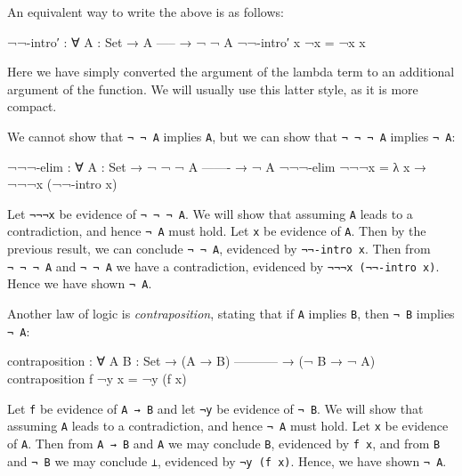 An equivalent way to write the above is as follows:

\begin{fence}
\begin{code}
¬¬-intro′ : ∀ {A : Set}
  → A
    -----
  → ¬ ¬ A
¬¬-intro′ x ¬x = ¬x x
\end{code}
\end{fence}

Here we have simply converted the argument of the lambda term to an
additional argument of the function. We will usually use this latter
style, as it is more compact.

We cannot show that \texttt{¬\ ¬\ A} implies \texttt{A}, but we can show
that \texttt{¬\ ¬\ ¬\ A} implies \texttt{¬\ A}:

\begin{fence}
\begin{code}
¬¬¬-elim : ∀ {A : Set}
  → ¬ ¬ ¬ A
    -------
  → ¬ A
¬¬¬-elim ¬¬¬x  =  λ x → ¬¬¬x (¬¬-intro x)
\end{code}
\end{fence}

Let \texttt{¬¬¬x} be evidence of \texttt{¬\ ¬\ ¬\ A}. We will show that
assuming \texttt{A} leads to a contradiction, and hence \texttt{¬\ A}
must hold. Let \texttt{x} be evidence of \texttt{A}. Then by the
previous result, we can conclude \texttt{¬\ ¬\ A}, evidenced by
\texttt{¬¬-intro\ x}. Then from \texttt{¬\ ¬\ ¬\ A} and \texttt{¬\ ¬\ A}
we have a contradiction, evidenced by \texttt{¬¬¬x\ (¬¬-intro\ x)}.
Hence we have shown \texttt{¬\ A}.

Another law of logic is \emph{contraposition}, stating that if
\texttt{A} implies \texttt{B}, then \texttt{¬\ B} implies \texttt{¬\ A}:

\begin{fence}
\begin{code}
contraposition : ∀ {A B : Set}
  → (A → B)
    -----------
  → (¬ B → ¬ A)
contraposition f ¬y x = ¬y (f x)
\end{code}
\end{fence}

Let \texttt{f} be evidence of \texttt{A\ →\ B} and let \texttt{¬y} be
evidence of \texttt{¬\ B}. We will show that assuming \texttt{A} leads
to a contradiction, and hence \texttt{¬\ A} must hold. Let \texttt{x} be
evidence of \texttt{A}. Then from \texttt{A\ →\ B} and \texttt{A} we may
conclude \texttt{B}, evidenced by \texttt{f\ x}, and from \texttt{B} and
\texttt{¬\ B} we may conclude \texttt{⊥}, evidenced by
\texttt{¬y\ (f\ x)}. Hence, we have shown \texttt{¬\ A}.

